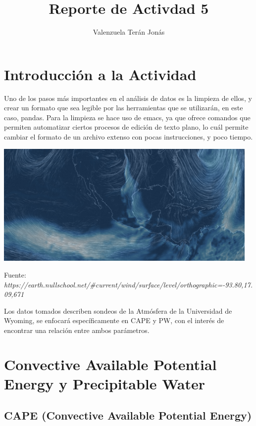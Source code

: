 \documentclass[a4paper]{article}
\title{Reporte de Activdad 5}
\author{Valenzuela Terán Jonás}
\begin{document}
\maketitle

\section{Introducción a la Actividad}

Uno de los pasos más importantes en el análisis de datos es la limpieza de ellos, y crear un formato que sea legible por las herramientas que se utilizarán, en este caso, pandas. Para la limpieza se hace uso de emacs, ya que ofrece comandos que permiten automatizar ciertos procesos de edición de texto plano, lo cuál permite cambiar el formato de un archivo extenso con pocas instrucciones, y poco tiempo. 

\begin{center}

\includegraphics[height=6cm]{rep5.PNG}

Fuente: \textit{https://earth.nullschool.net/\#current/wind/surface/level/orthographic=-93.80,17.09,671}

\end{center}

Los datos tomados describen sondeos de la Atmósfera de la Universidad de Wyoming, se enfocará específicamente en CAPE y PW, con el interés de encontrar una relación entre ambos parámetros.

\section{Convective Available Potential Energy y Precipitable Water}

	\subsection{CAPE (Convective Available Potential Energy)}
\end{document}
